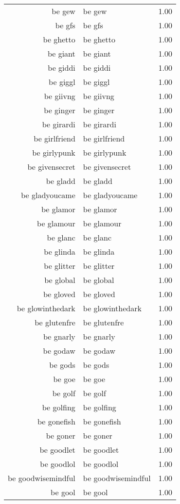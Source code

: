 \begin{table}[ht]
\begin{tabular}{rlr}
  be gew & be gew & 1.00 \\ 
  be gfs & be gfs & 1.00 \\ 
  be ghetto & be ghetto & 1.00 \\ 
  be giant & be giant & 1.00 \\ 
  be giddi & be giddi & 1.00 \\ 
  be giggl & be giggl & 1.00 \\ 
  be giivng & be giivng & 1.00 \\ 
  be ginger & be ginger & 1.00 \\ 
  be girardi & be girardi & 1.00 \\ 
  be girlfriend & be girlfriend & 1.00 \\ 
  be girlypunk & be girlypunk & 1.00 \\ 
  be givensecret & be givensecret & 1.00 \\ 
  be gladd & be gladd & 1.00 \\ 
  be gladyoucame & be gladyoucame & 1.00 \\ 
  be glamor & be glamor & 1.00 \\ 
  be glamour & be glamour & 1.00 \\ 
  be glanc & be glanc & 1.00 \\ 
  be glinda & be glinda & 1.00 \\ 
  be glitter & be glitter & 1.00 \\ 
  be global & be global & 1.00 \\ 
  be gloved & be gloved & 1.00 \\ 
  be glowinthedark & be glowinthedark & 1.00 \\ 
  be glutenfre & be glutenfre & 1.00 \\ 
  be gnarly & be gnarly & 1.00 \\ 
  be godaw & be godaw & 1.00 \\ 
  be gods & be gods & 1.00 \\ 
  be goe & be goe & 1.00 \\ 
  be golf & be golf & 1.00 \\ 
  be golfing & be golfing & 1.00 \\ 
  be gonefish & be gonefish & 1.00 \\ 
  be goner & be goner & 1.00 \\ 
  be goodlet & be goodlet & 1.00 \\ 
  be goodlol & be goodlol & 1.00 \\ 
  be goodwisemindful & be goodwisemindful & 1.00 \\ 
  be gool & be gool & 1.00 \\ 

\end{tabular}
\end{table}
